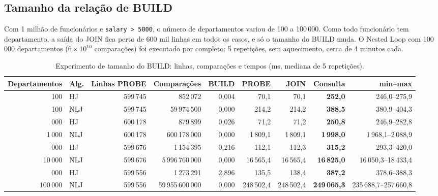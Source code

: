 \documentclass[11pt,a4paper]{article}
\begin{document}
\subsection{Tamanho da relação de BUILD}
Com 1 milhão de funcionários e \texttt{salary > 5000}, o número de departamentos variou de 100 a 100\,000. Como todo funcionário tem departamento, a saída do JOIN fica perto de 600 mil linhas em todos os casos, e só o tamanho do BUILD muda. O Nested Loop com 100\,000 departamentos ($6 \times 10^{10}$ comparações) foi executado por completo: 5 repetições, sem aquecimento, cerca de 4 minutos cada.

\begin{table}[H]
\centering
\footnotesize
\setlength{\tabcolsep}{3.5pt}
\begin{tabular}{@{}rlrrrrrrr@{}}
\toprule
Departamentos & Alg. & Linhas PROBE & Comparações & BUILD & PROBE & JOIN & Consulta & min--max \\
\midrule
100 & HJ & 599\,745 & 852\,072 & 0,004 & 70,1 & 70,1 & \textbf{252,0} & 246,0--275,9 \\
100 & NLJ & 599\,745 & 59\,974\,500 & 0,000 & 214,2 & 214,2 & \textbf{388,5} & 380,9--404,3 \\
\addlinespace[2pt]
1\,000 & HJ & 600\,178 & 879\,899 & 0,026 & 71,2 & 71,2 & \textbf{250,8} & 246,9--282,8 \\
1\,000 & NLJ & 600\,178 & 600\,178\,000 & 0,000 & 1\,809,1 & 1\,809,1 & \textbf{1\,998,0} & 1\,968,1--2\,088,9 \\
\addlinespace[2pt]
10\,000 & HJ & 599\,676 & 1\,154\,395 & 0,216 & 112,1 & 112,3 & \textbf{315,2} & 293,3--420,0 \\
10\,000 & NLJ & 599\,676 & 5\,996\,760\,000 & 0,000 & 16\,565,4 & 16\,565,4 & \textbf{16\,825,0} & 16\,050,3--18\,433,4 \\
\addlinespace[2pt]
100\,000 & HJ & 599\,556 & 1\,273\,291 & 2,896 & 135,5 & 138,4 & \textbf{387,2} & 378,6--388,3 \\
100\,000 & NLJ & 599\,556 & 59\,955\,600\,000 & 0,000 & 248\,502,4 & 248\,502,4 & \textbf{249\,065,3} & 235\,688,7--257\,660,8 \\
\bottomrule
\end{tabular}
\caption{Experimento de tamanho do BUILD: linhas, comparações e tempos (ms, mediana de 5 repetições).}
\label{tab:build-tempo}
\end{table}
\end{document}
